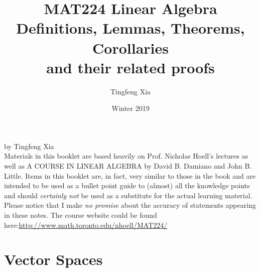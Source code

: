 \documentclass[oneside, 12pt]{book}
\title{%
  \textbf{MAT224 Linear Algebra}\\
  \large Definitions, Lemmas, Theorems, Corollaries \\
    and their related proofs}
\author{Tingfeng Xia}
\date{Winter 2019}
\newcommand{\tit}[1]{\textit{#1}}
\begin{document}
\frontmatter
\maketitle
\newpage %
\mbox{}
\vfill
by Tingfeng Xia \\


Materials in this booklet are based heavily on Prof. Nicholas Hoell's lectures as well as A COURSE IN LINEAR ALGEBRA by David B. Damiano and John B. Little.\newline\newline
Items in this booklet are, in fact, very similar to those in the book and are intended to be used as a bullet point guide to (almost) all the knowledge points and should \tit{certainly not} be used as a substitute for the actual learning material. Please notice that I make\tit{ no promise} about the accuracy of statements appearing in these notes.\newline\newline
The course website could be found here:\newline \url{http://www.math.toronto.edu/nhoell/MAT224/}
\newpage

\tableofcontents

\mainmatter

\chapter{Vector Spaces}
\end{document}
